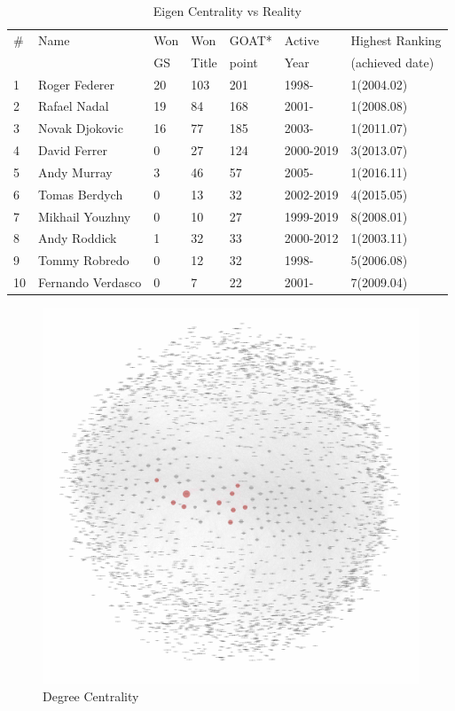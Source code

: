 \documentclass[runningheads]{llncs}
\begin{document}
\begin{table}
\centering
\caption{Eigen Centrality vs Reality} \label{tab_eigen_real}
\begin{tabular}{|l|l|l|l|l|l|l|}
\hline

\# & Name & Won & Won & GOAT* & Active & Highest Ranking \\ 
 &  & GS & Title & point & Year & (achieved date) \\ \hline
1 & Roger Federer & 20 & 103 & 201 & 1998- & 1(2004.02) \\ 
2 & Rafael Nadal & 19 & 84 & 168 & 2001- & 1(2008.08) \\ 
3 & Novak Djokovic & 16 & 77 & 185 & 2003- & 1(2011.07) \\ 
4 & David Ferrer & 0 & 27 & 124 & 2000-2019 & 3(2013.07) \\ 
5 & Andy Murray & 3 & 46 & 57 & 2005- & 1(2016.11) \\ 
6 & Tomas Berdych & 0 & 13 & 32 & 2002-2019 & 4(2015.05) \\ 
7 & Mikhail Youzhny & 0 & 10 & 27 & 1999-2019 & 8(2008.01) \\ 
8 & Andy Roddick & 1 & 32 & 33 & 2000-2012 & 1(2003.11) \\ 
9 & Tommy Robredo & 0 & 12 & 32 & 1998- & 5(2006.08) \\ 
10 & Fernando Verdasco & 0 & 7 & 22 & 2001- & 7(2009.04) \\ \hline

\end{tabular}
\end{table}


\begin{figure}
\centering
\includegraphics[width=\textwidth]{3a_degree_centrality}
\caption{Degree Centrality} \label{fig_3a_degree_centrality}
\end{figure}
\end{document}
